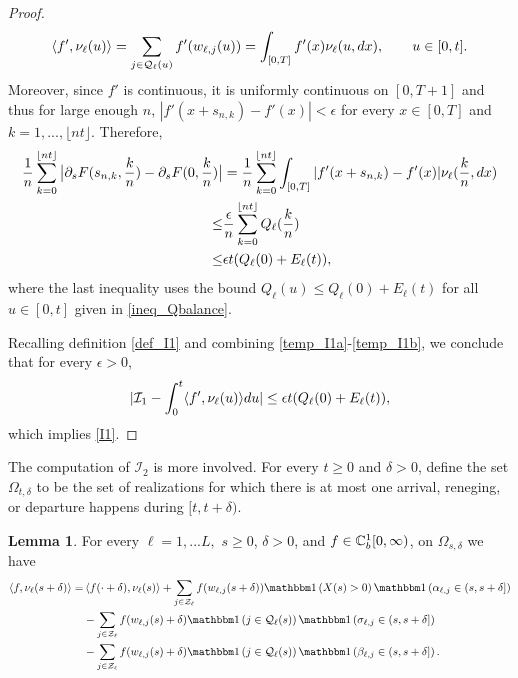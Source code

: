 \documentclass{article}
\theoremstyle{definition}
\newtheorem{lemma}[theorem]{Lemma}
\numberwithin{equation}{section}
\begin{document}
\begin{proof}
\[
\langle f',\nu_\ell(u)\rangle = \sum_{j\in\mathcal{Q}_\ell(u)} f'(w_{\ell,j}(u))=\int_{[0,T]}f'(x)\nu_\ell(u,dx),\quad\quad u\in[0,t].
\]
Moreover, since $f'$ is continuous, it is uniformly continuous on $[0,T+1]$ and thus for large enough $n$, $|f'(x+s_{n,k})-f'(x)|<\epsilon$ for every $x\in[0,T]$ and $k=1,...,\lfloor nt\rfloor$. Therefore, 
\begin{align}\label{temp_I1b}
\frac{1}{n}\sum_{k=0}^{\lfloor nt\rfloor} \big|\partial_sF(s_{n,k},\frac{k}{n})-\partial_sF(0,\frac{k}{n})\big| & =  \frac{1}{n}\sum_{k=0}^{\lfloor nt\rfloor} \int_{[0,T]} |f'(x+s_{n,k})-f'(x)|\nu_\ell(\frac{k}{n},dx)\notag \\
\leq & \frac{\epsilon}{n}\sum_{k=0}^{\lfloor nt\rfloor} Q_\ell(\frac{k}{n})\notag\\
\leq & \epsilon t (Q_\ell(0)+E_\ell(t)),
\end{align}
where the last inequality uses the bound $Q_\ell(u)\leq Q_\ell(0)+E_\ell(t)$ for all $u\in[0,t]$ given in \eqref{ineq_Qbalance}.

Recalling definition \ref{def_I1} and combining \eqref{temp_I1a}-\eqref{temp_I1b}, we conclude that for every $\epsilon>0$,
\[
|\mathcal{I}_1 - \int_0^t \langle f',\nu_\ell(u) \rangle du| \leq \epsilon t (Q_\ell(0)+E_\ell(t)),
\]
which implies \eqref{I1}.
\end{proof}


The computation of $\mathcal{I}_2$ is more involved. For every $t\geq0$ and $\delta>0$, define the set $\Omega_{t,\delta}$ to be the set of realizations for which there is at most one arrival, reneging, or departure happens during $[t,t+\delta)$.


\begin{lemma}\label{lem_nufchange}
    For every $\ell=1,...L,$ $s\geq0$, $\delta>0$, and $f\in\mathbb{C}_b^{1}[0,\infty)$, on $\Omega_{s,\delta}$ we have
    \begin{align}\label{nufchange}
      \pair{f}{\nu_\ell(s+\delta)}= & \pair{f(\cdot+\delta)}{\nu_\ell(s)}+ \sum_{j\in\indexSet_\ell}f(w_{\ell,j}(s+\delta))\indic{X(s)>0}\indic{\arrivaltime_{\ell,j}\in(s,s+\delta]}\\
      & - \sum_{j\in\indexSet_\ell}f(w_{\ell,j}(s)+\delta)\indic{j\in\inque_\ell(s)} \indic{\renegtime_{\ell,j}\in(s,s+\delta]} \notag\\
&- \sum_{j\in\indexSet_\ell}f(w_{\ell,j}(s)+\delta)\indic{j\in\inque_\ell(s)}
\indic{\entrytime_{\ell,j}\in(s,s+\delta]}.\notag
    \end{align}
\end{lemma}
\end{document}
